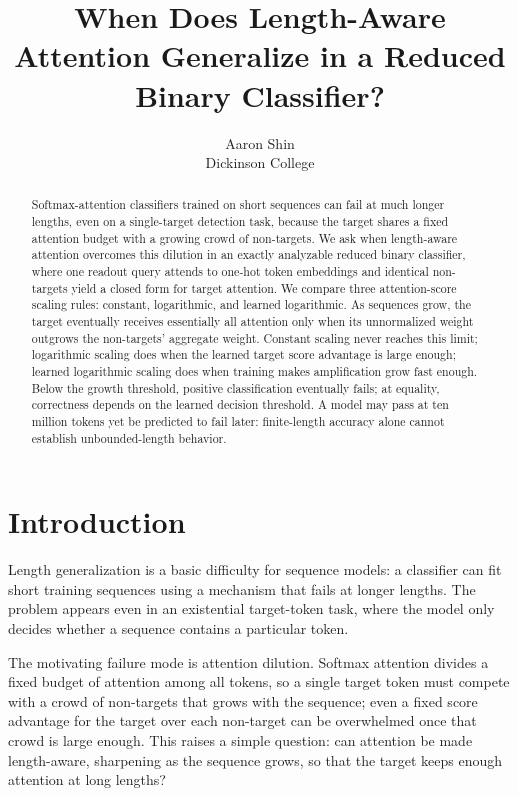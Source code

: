 \documentclass{article}
\title{When Does Length-Aware Attention Generalize in a Reduced Binary Classifier?}
\author{%
  Aaron Shin\\
  Dickinson College
}
\begin{document}
\maketitle

\begin{abstract}
Softmax-attention classifiers trained on short sequences can fail at much longer
lengths, even on a single-target detection task, because the target shares a
fixed attention budget with a growing crowd of non-targets. We ask when
length-aware attention overcomes this dilution in an exactly analyzable reduced
binary classifier, where one readout query attends to one-hot token embeddings
and identical non-targets yield a closed form for target attention. We compare
three attention-score scaling rules: constant, logarithmic, and learned
logarithmic. As sequences grow,
the target eventually receives essentially all attention only when its
unnormalized weight outgrows the non-targets' aggregate weight. Constant scaling
never reaches this limit; logarithmic scaling does when the learned target score
advantage is large enough; learned logarithmic scaling does when training makes
amplification grow fast enough. Below the growth threshold, positive
classification eventually fails; at equality, correctness depends on the
learned decision threshold. A model may pass at ten million tokens yet be
predicted to fail later: finite-length accuracy alone cannot establish
unbounded-length behavior.
\end{abstract}

\section{Introduction}
\label{sec:introduction}

Length generalization is a basic difficulty for sequence models: a classifier
can fit short training sequences using a mechanism that fails at longer lengths.
The problem appears even in an existential target-token task, where the model
only decides whether a sequence contains a particular token.

The motivating failure mode is attention dilution. Softmax attention divides a
fixed budget of attention among all tokens, so a single target token must
compete with a crowd of non-targets that grows with the sequence; even a fixed
score advantage for the target over each non-target can be overwhelmed once
that crowd is large enough. This raises a simple question: can attention be made
length-aware, sharpening as the sequence grows, so that the target keeps enough
attention at long lengths?
\end{document}
